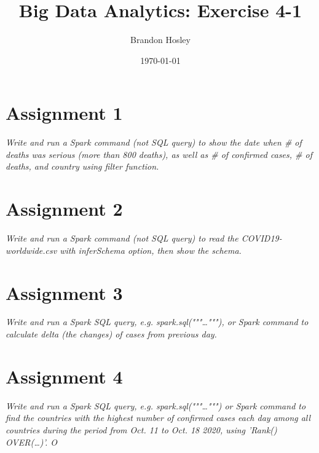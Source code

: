 \documentclass[]{article}
\title{Big Data Analytics: Exercise 4-1}
\author{Brandon Hosley}
\date{\today}
\begin{document}
\maketitle

\section*{Assignment 1}
\emph{ Write and run a Spark command (not SQL query) to show the date when # of deaths was serious (more than 800 deaths), as well as # of confirmed cases, # of deaths, and country using filter function. }



\section*{Assignment 2}
\emph{ Write and run a Spark command (not SQL query) to read the COVID19-worldwide.csv with inferSchema option, then show the schema.
}



\section*{Assignment 3}
\emph{ Write and run a Spark SQL query, e.g. spark.sql("""\ldots"""), or Spark command to calculate delta (the changes) of cases from previous day. }


\section*{Assignment 4}
\emph{ Write and run a Spark SQL query, e.g. spark.sql("""\ldots""") or Spark command to find the 	countries with the highest number of confirmed cases each day among all countries during the period from Oct. 11 to Oct. 18 2020, using 'Rank() OVER(\ldots)'. O }
\end{document}
